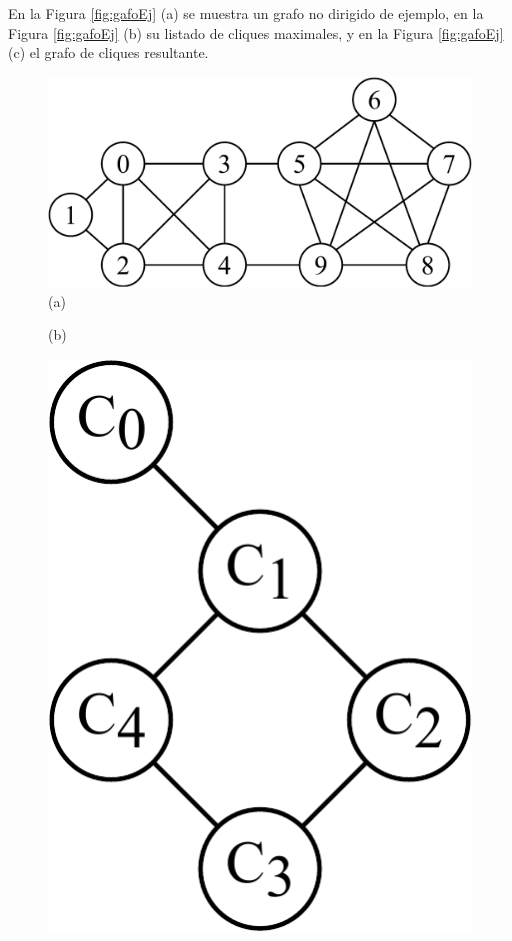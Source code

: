En la Figura \ref{fig:gafoEj} (a) se muestra un grafo no dirigido de ejemplo, en la Figura \ref{fig:gafoEj} (b) su listado de cliques maximales, y en la Figura \ref{fig:gafoEj} (c) el grafo de cliques resultante.


\begin{figure}
    	\centering
    	\begin{minipage}{0.4\textwidth}
    		\centering
    		\includegraphics[width=1\linewidth,clip=true]{img/graphs-Graph2.pdf}
    		(a)
    	\end{minipage}
    	\begin{minipage}{0.4\textwidth}
    		\centering
    		
    		(b)
    	\end{minipage}
    	\begin{minipage}{0.15\textwidth}
    		\centering
    		\includegraphics[width=1\linewidth,clip=true]{img/graphs-Cliques2.pdf}

\end{minipage}
\end{figure}
